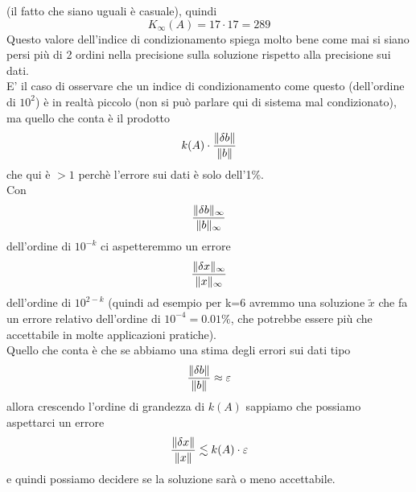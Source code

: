 \documentclass[12pt,a4paper]{article}
\DeclarePairedDelimiter{\norma}{\lVert}{\rVert}
\begin{document}
(il fatto che siano uguali è casuale), quindi
\begin{equation*}
    K_\infty(A) = 17 \cdot 17 = 289
\end{equation*}
Questo valore dell'indice di condizionamento spiega molto bene come mai si siano persi più di 2 ordini nella precisione sulla soluzione rispetto alla precisione sui dati.\\
E' il caso di osservare che un indice di condizionamento come questo (dell'ordine di $10^2$) è in realtà piccolo (non si può parlare qui di sistema mal condizionato), ma quello che conta è il prodotto
\begin{equation*}
   k(A)\cdot \frac{\norma{\delta b}}{\norma{b}}
\end{equation*} che qui è $>1$ perchè l'errore sui dati è solo dell'1\%.\\Con 
\begin{equation*}
    \frac{\norma{\delta b}_\infty}{\norma{b}_\infty}
\end{equation*} 
dell'ordine di $10^{-k}$ ci aspetteremmo un errore 
\begin{equation*}
    \frac{\norma{\delta x}_\infty}{\norma{x}_\infty} 
\end{equation*}dell'ordine di $10^{2-k}$ (quindi ad esempio per k=6 avremmo una soluzione $\tilde{x}$ che fa un errore relativo dell'ordine di $10^{-4}=0.01\%$, che potrebbe essere più che accettabile in molte applicazioni pratiche).\\
Quello che conta è che se abbiamo una stima degli errori sui dati tipo
\begin{equation*}
    \frac{\norma{\delta b}}{\norma{b}}\approx \varepsilon
\end{equation*} allora crescendo l'ordine di grandezza di $k(A)$ sappiamo che possiamo aspettarci un errore 
\begin{equation*}
    \frac{\norma{\delta x}}{\norma{x}}\lesssim k(A)\cdot\varepsilon
\end{equation*}
e quindi possiamo decidere se la soluzione sarà o meno accettabile.
\end{document}
